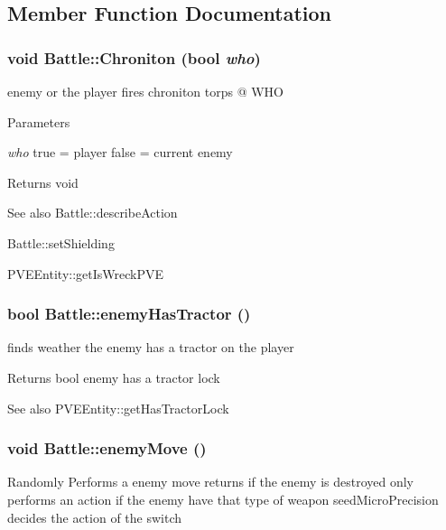 \subsection{Member Function Documentation}
\hypertarget{classBattle_ac27cb8ae9cc2220d90446de6d5c2a03e}{
\subsubsection[{Chroniton}]{\setlength{\rightskip}{0pt plus 5cm}void Battle::Chroniton (bool {\em who})}}
\label{dd/dfd/classBattle_ac27cb8ae9cc2220d90446de6d5c2a03e}
enemy or the player fires chroniton torps @ WHO


\begin{DoxyParams}{Parameters}
\item[{\em who}]true = player false = current enemy\end{DoxyParams}
\begin{DoxyReturn}{Returns}
void
\end{DoxyReturn}
\begin{DoxySeeAlso}{See also}
Battle::describeAction 

Battle::setShielding

PVEEntity::getIsWreckPVE 
\end{DoxySeeAlso}
\hypertarget{classBattle_a4c6da8cc9af5dd34901c18a9d54ea139}{
\subsubsection[{enemyHasTractor}]{\setlength{\rightskip}{0pt plus 5cm}bool Battle::enemyHasTractor ()}}
\label{dd/dfd/classBattle_a4c6da8cc9af5dd34901c18a9d54ea139}
finds weather the enemy has a tractor on the player

\begin{DoxyReturn}{Returns}
bool enemy has a tractor lock
\end{DoxyReturn}
\begin{DoxySeeAlso}{See also}
PVEEntity::getHasTractorLock 
\end{DoxySeeAlso}
\hypertarget{classBattle_a21c7d3fe2b8f8acdcf52d7dc03ee0845}{
\subsubsection[{enemyMove}]{\setlength{\rightskip}{0pt plus 5cm}void Battle::enemyMove ()}}
\label{dd/dfd/classBattle_a21c7d3fe2b8f8acdcf52d7dc03ee0845}
Randomly Performs a enemy move returns if the enemy is destroyed only performs an action if the enemy have that type of weapon seedMicroPrecision decides the action of the switch

